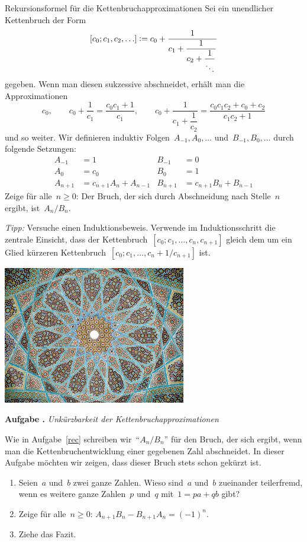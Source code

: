 \documentclass[a4paper,ngerman,twoside]{scrartcl}
\newcommand{\defeq}{\vcentcolon=}
\newlength{\aufgabenskip}
\newcounter{aufgabennummer}
\newenvironment{aufgabe}[1]{
  \addtocounter{aufgabennummer}{1}
  \textbf{Aufgabe \theaufgabennummer.} \emph{#1} \par
}{\vspace{\aufgabenskip}}
\newenvironment{aufgabe*}[1]{
  \addtocounter{aufgabennummer}{1}
  \textbf{Aufgabe* \theaufgabennummer.} \emph{#1} \par
}{\vspace{\aufgabenskip}}
\begin{document}
\begin{aufgabe*}{Rekursionsformel für die Kettenbruchapproximationen}\label{rec}
Sei ein unendlicher Kettenbruch der Form
\[ [c_0;c_1,c_2,\ldots] \defeq c_0 + \dfrac{1}{c_1 + \dfrac{1}{c_2 + \dfrac{1}{\ddots}}} \]
gegeben. Wenn man diesen sukzessive abschneidet, erhält man die Approximationen
\[ c_0, \qquad
  c_0 + \dfrac{1}{c_1} = \frac{c_0c_1 + 1}{c_1}, \qquad
  c_0 + \dfrac{1}{c_1 + \dfrac{1}{c_2}} = \frac{c_0c_1c_2 + c_0 +
  c_2}{c_1c_2+1}
\]
und so weiter. Wir definieren induktiv Folgen~$A_{-1},A_0,\ldots$
und~$B_{-1},B_0,\ldots$ durch folgende Setzungen:
\begin{align*}
  A_{-1} &= 1 & B_{-1} &= 0 \\
  A_0 &= c_0 & B_0 &= 1 \\
  A_{n+1} &= c_{n+1} A_n + A_{n-1} & B_{n+1} &= c_{n+1} B_n + B_{n-1}
\end{align*}
Zeige für alle~$n \geq 0$: Der Bruch, der sich durch Abschneidung nach
Stelle~$n$ ergibt, ist~$A_n/B_n$.

\emph{Tipp:} Versuche einen Induktionsbeweis. Verwende im Induktionsschritt die
zentrale Einsicht, dass der Kettenbruch~$[c_0;c_1,\ldots,c_n,c_{n+1}]$ gleich
dem um ein Glied kürzeren Kettenbruch~$[c_0;c_1,\ldots,c_n+1/c_{n+1}]$ ist.
\end{aufgabe*}

\vfill
\begin{center}\includegraphics[width=0.60\textwidth]{hafez-tomb}\end{center}

\begin{aufgabe}{Unkürzbarkeit der Kettenbruchapproximationen}
Wie in Aufgabe~\ref{rec} schreiben wir~"`$A_n/B_n$"' für den Bruch, der sich
ergibt, wenn man die Kettenbruchentwicklung einer gegebenen Zahl abschneidet.
In dieser Aufgabe möchten wir zeigen, dass dieser Bruch stets schon gekürzt
ist.
\begin{enumerate}
\item Seien~$a$ und~$b$ zwei ganze Zahlen. Wieso sind~$a$ und~$b$ zueinander
teilerfremd, wenn es weitere ganze Zahlen~$p$ und~$q$ mit~$1 = pa + qb$ gibt?
\item Zeige für alle~$n \geq 0$: $A_{n+1} B_n - B_{n+1} A_n = (-1)^n$.
\item Ziehe das Fazit.
\end{enumerate}
\end{aufgabe}
\end{document}
